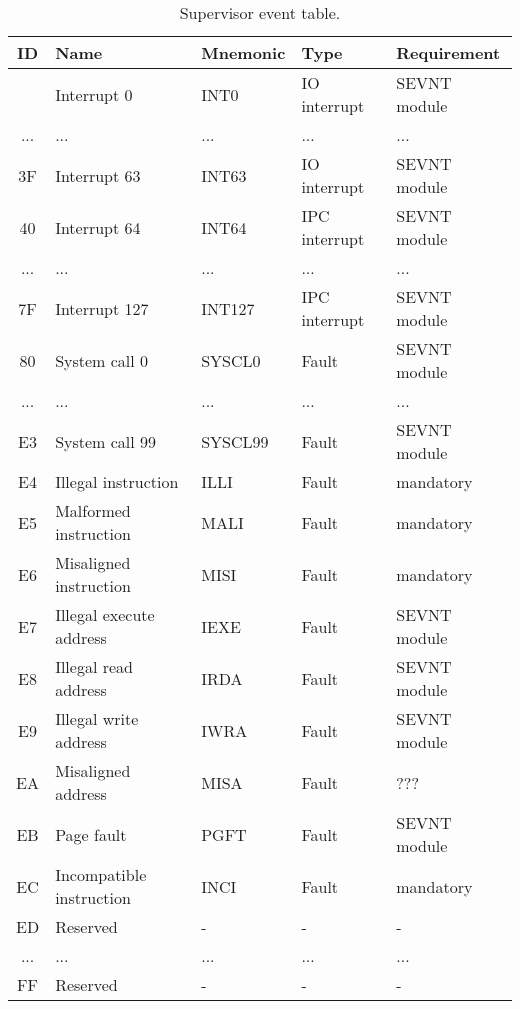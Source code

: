 \begin{table}[hbt!] %

    \begin{center}

    \begin{tabular}{|c|l|l|l|l|}

        \hline
        ID & Name & Mnemonic & Type & Requirement \\
        \hline
        \addlinespace[10pt]
        \hline
        00 & Interrupt 0 & INT0 & IO interrupt & SEVNT module \\
        \hline
        ... & ... & ... & ... & ... \\
        \hline
        3F & Interrupt 63 & INT63 & IO interrupt & SEVNT module \\
        \hline
        40 & Interrupt 64 & INT64 & IPC interrupt & SEVNT module \\
        \hline
        ... & ... & ... & ... & ... \\
        \hline
        7F & Interrupt 127 & INT127 & IPC interrupt & SEVNT module \\
        \hline
        80 & System call 0 & SYSCL0 & Fault & SEVNT module \\
        \hline
        ... & ... & ... & ... & ... \\
        \hline
        E3 & System call 99 & SYSCL99 & Fault & SEVNT module \\
        \hline
        E4 & Illegal instruction & ILLI & Fault & mandatory \\
        \hline
        E5 & Malformed instruction & MALI & Fault & mandatory \\
        \hline
        E6 & Misaligned instruction & MISI & Fault & mandatory \\
        \hline
        E7 & Illegal execute address & IEXE & Fault & SEVNT module  \\
        \hline
        E8 & Illegal read address & IRDA & Fault & SEVNT module  \\
        \hline
        E9 & Illegal write address & IWRA & Fault & SEVNT module  \\
        \hline
        EA & Misaligned address & MISA & Fault & ??? \\
        \hline
        EB & Page fault & PGFT & Fault & SEVNT module \\
        \hline
        EC & Incompatible instruction & INCI & Fault & mandatory \\
        \hline
        ED & Reserved & - & - & - \\
        \hline
        ... & ... & ... & ... & ... \\
        \hline
        FF & Reserved & - & - & - \\
        \hline

    \end{tabular}

    \caption[Supervisor event table]{Supervisor event table.}

    \end{center}

\end{table}